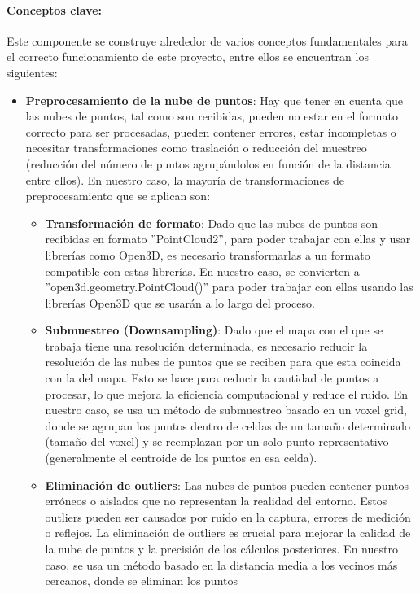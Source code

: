 \documentclass[12pt, a4paper, twoside]{article}
\begin{document}
\paragraph{Conceptos clave:}
Este componente se construye alrededor de varios conceptos fundamentales para el correcto funcionamiento de este proyecto, entre ellos se encuentran los 
siguientes:
\begin{itemize}
  \item \textbf{Preprocesamiento de la nube de puntos}: Hay que tener en cuenta que las nubes de puntos, tal como son recibidas, pueden no estar en el formato 
  correcto para ser procesadas, pueden contener errores, estar incompletas o necesitar transformaciones como traslación o reducción del muestreo (reducción 
  del número de puntos agrupándolos en función de la distancia entre ellos). En nuestro caso, la mayoría de transformaciones de preprocesamiento que se aplican 
  son:
  \begin{itemize}
    \item \textbf{Transformación de formato}: Dado que las nubes de puntos son recibidas en formato ''PointCloud2'', para poder trabajar con ellas y usar librerías como
    Open3D\cite{Zhou2018}, es necesario transformarlas a un formato compatible con estas librerías. En nuestro caso, se convierten a
    ''open3d.geometry.PointCloud()'' para poder trabajar con ellas usando las librerías Open3D\cite{Zhou2018} que se usarán a lo largo del proceso. 
    \item \textbf{Submuestreo (Downsampling)}: Dado que el mapa con el que se trabaja tiene una resolución determinada, es necesario reducir la resolución de
    las nubes de puntos que se reciben para que esta coincida con la del mapa. Esto se hace para reducir la cantidad de puntos a procesar, lo que mejora la 
    eficiencia computacional y reduce el ruido. En nuestro caso, se usa un método de submuestreo basado en un voxel grid, donde se agrupan los puntos dentro 
    de celdas de un tamaño determinado (tamaño del voxel) y se reemplazan por un solo punto representativo (generalmente el centroide de los puntos en esa celda).
    \item \textbf{Eliminación de outliers}: Las nubes de puntos pueden contener puntos erróneos o aislados que no representan la realidad del entorno. Estos outliers 
    pueden ser causados por ruido en la captura, errores de medición o reflejos. La eliminación de outliers es crucial para mejorar la calidad de la nube de puntos y 
    la precisión de los cálculos posteriores. En nuestro caso, se usa un método basado en la distancia media a los vecinos más cercanos, donde se eliminan los puntos 

\end{itemize}
\end{itemize}
\end{document}
